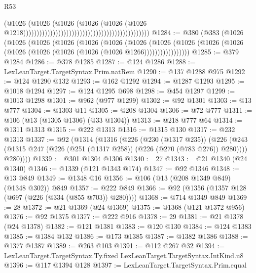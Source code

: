 \begin{lexlean}{R53}
\begin{coremodule}
                                                                                      (@1026
                                                                                        (@1026
                                                                                          (@1026
                                                                                            (@1026
                                                                                              (@1026
                                                                                                (@1026
                                                                                                  @1218)))))))))))))))))))))))))))))))))))))))))))))))
@1284 := @380
    (@383
      (@1026
        (@1026
          (@1026
            (@1026
              (@1026
                (@1026
                  (@1026
                    (@1026
                      (@1026 (@1026 (@1026 (@1026 (@1026 (@1026 (@1026 (@1026 @1266)))))))))))))))))
@1285 := @379 @1284
@1286 := @378 @1285
@1287 := @124 @1286
@1288 := LexLeanTarget.TargetSyntax.Prim.natRem
@1290 := @137 @1288 @975
@1292 := @124 @1290 @132
@1293 := @162 @1292
@1294 := @1287 @1293
@1295 := @1018 @1294
@1297 := @124 @1295 @698
@1298 := @454 @1297
@1299 := @1013 @1298
@1301 := @962 (@977 @1299)
@1302 := @92 @1301
@1303 := @13 @777
@1304 := @1303 @11
@1305 := @208 @1304
@1306 := @72 @777
@1311 := @106 (@13 (@1305 @1306) (@33 @1304))
@1313 := @218 @777 @64
@1314 := @1311 @1313
@1315 := @222 @1313
@1316 := @1315 @130
@1317 := @232 @1313
@1337 := @92
    (@1314
      (@1316
        (@226
          (@230 (@1317 @235))
          (@226
            (@243 (@1315 @247 (@226 (@251 (@1317 @258)) (@226 (@270 (@783 @276)) @280))))
            @280))))
@1339 := @301 @1304 @1306
@1340 := 27
@1343 := @21 @1340 (@24 @1340)
@1346 := @1339 (@121 @1343 @174)
@1347 := @92 @1346
@1348 := @13 @849
@1349 := @1348 @16
@1356 := @106 (@13 (@208 @1349 @849) (@1348 @302)) @849
@1357 := @222 @849
@1366 := @92 (@1356 (@1357 @128 (@697 (@226 (@334 (@855 @703)) @280))))
@1368 := @714 @1349 @849
@1369 := 28
@1372 := @21 @1369 (@24 @1369)
@1375 := @1368 (@121 @1372 @956)
@1376 := @92 @1375
@1377 := @222 @916
@1378 := 29
@1381 := @21 @1378 (@24 @1378)
@1382 := @121 @1381
@1383 := @120 @130
@1384 := @124 @1383
@1385 := @1384 @132
@1386 := @173 @1385
@1387 := @1382 @1386
@1388 := @1377 @1387
@1389 := @263 @103
@1391 := @112 @267 @32
@1394 := LexLeanTarget.TargetSyntax.Ty.fixed LexLeanTarget.TargetSyntax.IntKind.u8
@1396 := @117 @1394 @128
@1397 := LexLeanTarget.TargetSyntax.Prim.equal

\end{coremodule}
\end{lexlean}
